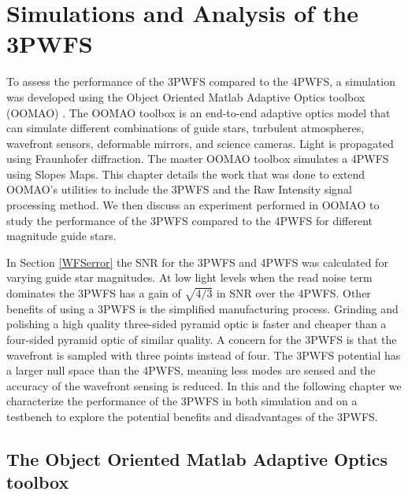 \chapter{Simulations and Analysis of the 3PWFS}\label{CH4}

To assess the performance of the 3PWFS compared to the 4PWFS, a simulation was developed using the Object Oriented Matlab Adaptive Optics toolbox (OOMAO) \citep{OOMAO}. The OOMAO toolbox is an end-to-end adaptive optics model that can simulate different combinations of guide stars, turbulent atmospheres, wavefront sensors, deformable mirrors, and science cameras. Light is propagated using Fraunhofer diffraction. The master OOMAO toolbox simulates a 4PWFS using Slopes Maps. This chapter details the work that was done to extend OOMAO's utilities to include the 3PWFS and the Raw Intensity signal processing method. We then discuss an experiment performed in OOMAO to study the performance of the 3PWFS compared to the 4PWFS for different magnitude guide stars.

In Section \ref{WFSerror} the SNR for the 3PWFS and 4PWFS was calculated for varying guide star magnitudes. At low light levels when the read noise term dominates the 3PWFS has a gain of $\sqrt{4/3}$ in SNR over the 4PWFS. Other benefits of using a 3PWFS is the simplified manufacturing process. Grinding and polishing a high quality three-sided pyramid optic is faster and cheaper than a four-sided pyramid optic of similar quality. A concern for the 3PWFS is that the wavefront is sampled with three points instead of four. The 3PWFS potential has a larger null space than the 4PWFS, meaning less modes are sensed and the accuracy of the wavefront sensing is reduced. In this and the following chapter we characterize the performance of the 3PWFS in both simulation and on a testbench to explore the potential benefits and disadvantages of the 3PWFS.


\section{The Object Oriented Matlab Adaptive Optics toolbox}

